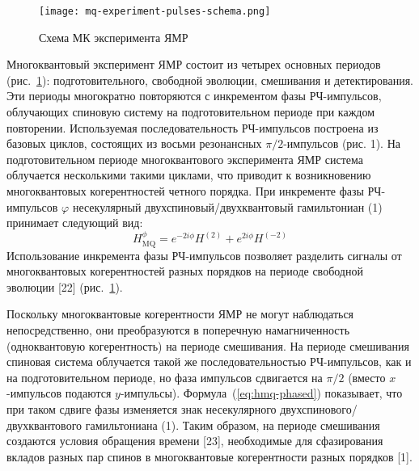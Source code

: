 %
%
%
\begin{figure}
  \centering
  \texttt{[image: mq-experiment-pulses-schema.png]}
  \caption{Схема МК эксперимента ЯМР}
  \label{fig:mq-experiment-pulses-schema}
\end{figure}

Многоквантовый эксперимент ЯМР состоит из четырех основных периодов (рис.~\ref{fig:mq-experiment-pulses-schema}): подготовительного, свободной эволюции, смешивания и детектирования.
Эти периоды многократно повторяются с инкрементом фазы РЧ-импульсов, облучающих спиновую систему на подготовительном периоде при каждом повторении. Используемая последовательность РЧ-импульсов построена из базовых циклов, состоящих из восьми резонансных $\pi/2$-импульсов (рис. 1).
На подготовительном периоде многоквантового эксперимента ЯМР
система облучается несколькими такими циклами,
что приводит к возникновению многоквантовых когерентностей четного порядка.
При инкременте фазы РЧ-импульсов $\varphi$ несекулярный двухспиновый/двухквантовый гамильтониан (1) принимает следующий вид:
%
\begin{equation}\label{eq:hmq-phased}
    H_\mathrm{MQ}^{\phi} = e^{-2i\phi}H^{(2)} + e^{2i\phi}H^{(-2)}
\end{equation}
%
Использование инкремента фазы РЧ-импульсов позволяет разделить сигналы от многоквантовых когерентностей разных порядков на периоде свободной эволюции [22] (рис.~\ref{fig:mq-experiment-pulses-schema}).

Поскольку многоквантовые когерентности ЯМР не могут наблюдаться непосредственно, они преобразуются в поперечную намагниченность (одноквантовую когерентность) на периоде смешивания. На периоде смешивания спиновая система облучается такой же последовательностью РЧ-импульсов, как и на подготовительном периоде, но фаза импульсов сдвигается на $\pi/2$
(вместо $x$-импульсов подаются  $y$-импульсы).
Формула~(\ref{eq:hmq-phased}) показывает, что при таком сдвиге фазы изменяется знак несекулярного двухспинового/двухквантового гамильтониана (1). Таким образом, на периоде смешивания создаются условия обращения времени [23], необходимые для сфазирования вкладов разных пар спинов в многоквантовые когерентности разных порядков [1].

